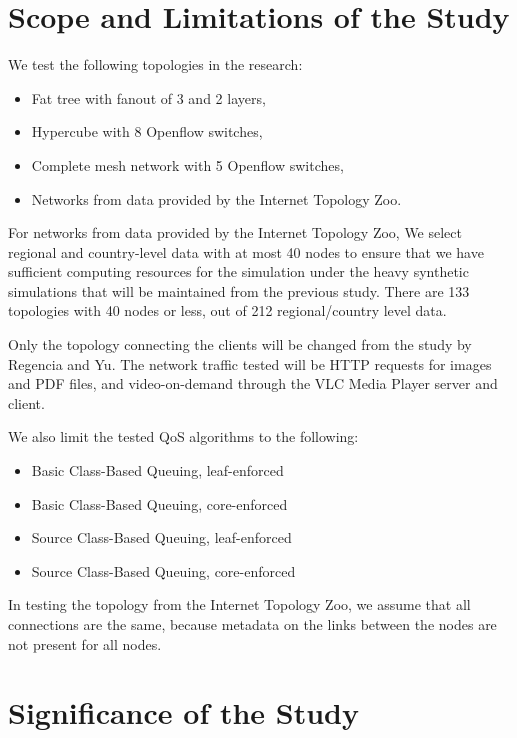 \section{Scope and Limitations of the Study}

We test the following topologies in the research:
\begin{itemize}
    \item Fat tree with fanout of 3 and 2 layers,
    \item Hypercube with 8 Openflow switches,
    \item Complete mesh network with 5 Openflow switches,
    \item Networks from data provided by the Internet Topology Zoo.
\end{itemize}

For networks from data provided by the Internet Topology Zoo, We select regional and country-level data with at most 40 nodes to ensure that we have sufficient computing resources for the simulation under the heavy synthetic simulations that will be maintained from the previous study. There are 133 topologies with 40 nodes or less, out of 212 regional/country level data. 

Only the topology connecting the clients will be changed from the study by Regencia and Yu. The network traffic tested will be HTTP requests for images and PDF files, and video-on-demand through the VLC Media Player server and client.
    
We also limit the tested QoS algorithms to the following:
\begin{itemize}
    \item Basic Class-Based Queuing, leaf-enforced
    \item Basic Class-Based Queuing, core-enforced
    \item Source Class-Based Queuing, leaf-enforced
    \item Source Class-Based Queuing, core-enforced
\end{itemize}

In testing the topology from the Internet Topology Zoo, we assume that all connections are the same, because metadata on the links between the nodes are not present for all nodes.

\section{Significance of the Study}

